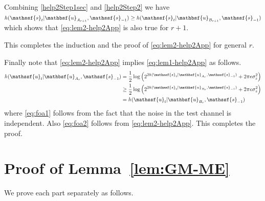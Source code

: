 \documentclass[journal, twocolumn, 10pt]{IEEEtran}
\newcommand{\rvs}{{\mathssf{s}}}    %
\newcommand{\rvu}{{\mathssf{u}}}    %
\newcommand{\rvbu}{{\mathbsf{u}}}
\begin{document}
{Combining \eqref{help2Step1sec} and \eqref{help2Step2} we have $h(\rvs_{t}| \rvbu_{A_{r+1}}, \rvs_{-1}) \ge h(\rvs_{t}| \rvbu_{B_{r+1}}, \rvs_{-1})$ which shows that \eqref{eq:lem2-help2App} is also true for $r+1$. 

This completes the induction and the proof of \eqref{eq:lem2-help2App} for general $r$. 

Finally note that \eqref{eq:lem2-help2App} implies \eqref{eq:lem1-help2App}  as follows. 
\begin{align}
h(\rvu_{t}| \rvbu_{A_r}, \rvs_{-1}) &=  \frac{1}{2} \log \left(2^{2h(\rvs_{t}| \rvbu_{A_r}, \rvs_{-1})} +  2 \pi e \sigma^2_{z}   \right) \label{eq:foa1} \\
& \ge \frac{1}{2} \log \left(2^{2h(\rvs_{t}| \rvbu_{B_r}, \rvs_{-1})} +  2 \pi e \sigma^2_{z}   \right) \label{eq:foa2}\\
& = h(\rvu_{t}| \rvbu_{B_r}, \rvs_{-1}) 
\end{align} where \eqref{eq:foa1} follows from the fact that the noise in the test channel is independent. Also \eqref{eq:foa2} follows from \eqref{eq:lem2-help2App}. 
This completes the proof.

\section{Proof of Lemma~\ref{lem:GM-ME}}
\label{App:Lemma7}

We prove each part separately as follows.

}
\end{document}
